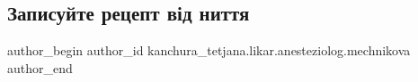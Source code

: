  
 
 
 
 

\subsection{Записуйте рецепт від ниття}
\label{sec:25_11_2022.fb.kanchura_tetjana.likar.anesteziolog.mechnikova.1.zapisuite_retsept_v_}

\ifcmt
 author_begin
   author_id kanchura_tetjana.likar.anesteziolog.mechnikova
 author_end
\fi
